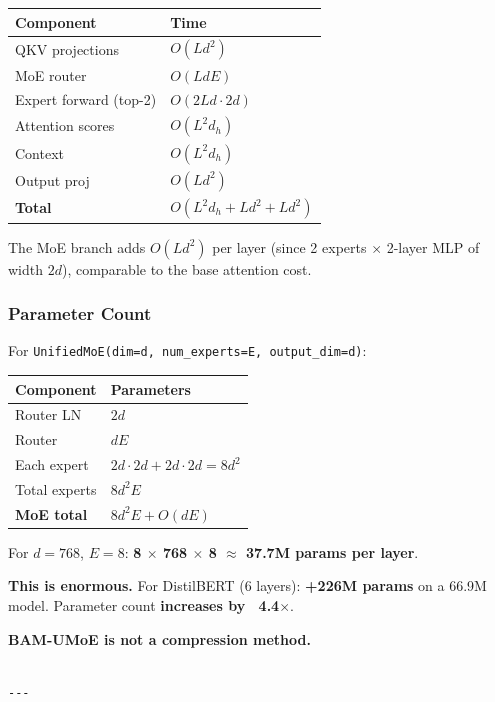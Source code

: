\begin{table}[H]
\centering
\small
\begin{tabular}{ll}
\toprule
\textbf{Component} & \textbf{Time} \\
\midrule
QKV projections & $O(L d^2)$ \\
MoE router & $O(L d E)$ \\
Expert forward (top-2) & $O(2 L d \cdot 2 d)$ \\
Attention scores & $O(L^2 d_h)$ \\
Context & $O(L^2 d_h)$ \\
Output proj & $O(L d^2)$ \\
\textbf{Total} & $O(L^2 d_h + L d^2 + L d^2)$ \\
\bottomrule
\end{tabular}
\end{table}

The MoE branch adds $O(L d^2)$ per layer (since 2 experts $\times$ 2-layer MLP 
of width $2d$), comparable to the base attention cost.

\subsubsection{Parameter Count}

For \texttt{UnifiedMoE(dim=d, num\_experts=E, output\_dim=d)}:

\begin{table}[H]
\centering
\small
\begin{tabular}{ll}
\toprule
\textbf{Component} & \textbf{Parameters} \\
\midrule
Router LN & $2d$ \\
Router & $d E$ \\
Each expert & $2d \cdot 2d + 2d \cdot 2d = 8d^2$ \\
Total experts & $8 d^2 E$ \\
\textbf{MoE total} & $8 d^2 E + O(d E)$ \\
\bottomrule
\end{tabular}
\end{table}

For $d = 768$, $E = 8$: \textbf{8 $\times$ 768  $\times$ 8 $\approx$ 37.7M params per layer}.

\textbf{This is enormous.} For DistilBERT (6 layers): \textbf{+226M params} on a 
66.9M model. Parameter count \textbf{increases by ~4.4$\times$}.

\textbf{BAM-UMoE is not a compression method.}
\begin{lstlisting}

---
\end{lstlisting}

